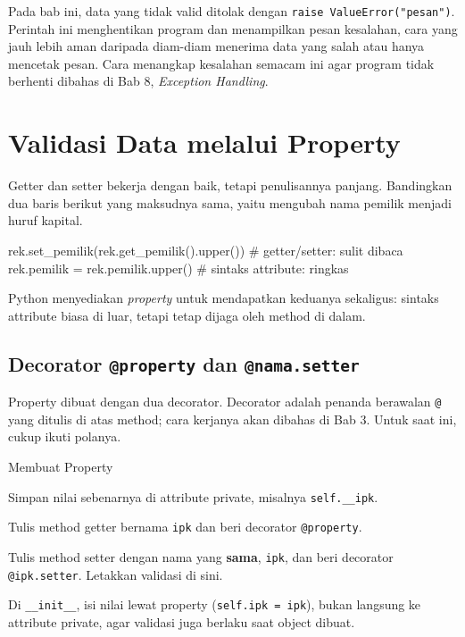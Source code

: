 \begin{info}
Pada bab ini, data yang tidak valid ditolak dengan \texttt{raise ValueError("pesan")}. Perintah ini menghentikan program dan menampilkan pesan kesalahan, cara yang jauh lebih aman daripada diam-diam menerima data yang salah atau hanya mencetak pesan. Cara menangkap kesalahan semacam ini agar program tidak berhenti dibahas di Bab 8, \emph{Exception Handling}.
\end{info}

\section{Validasi Data melalui Property}

Getter dan setter bekerja dengan baik, tetapi penulisannya panjang. Bandingkan dua baris berikut yang maksudnya sama, yaitu mengubah nama pemilik menjadi huruf kapital.

\begin{kode}
rek.set_pemilik(rek.get_pemilik().upper())   # getter/setter: sulit dibaca
rek.pemilik = rek.pemilik.upper()            # sintaks attribute: ringkas
\end{kode}

Python menyediakan \emph{property} untuk mendapatkan keduanya sekaligus: sintaks attribute biasa di luar, tetapi tetap dijaga oleh method di dalam.

\subsection{Decorator \texttt{@property} dan \texttt{@nama.setter}}

Property dibuat dengan dua decorator. Decorator adalah penanda berawalan \texttt{@} yang ditulis di atas method; cara kerjanya akan dibahas di Bab 3. Untuk saat ini, cukup ikuti polanya.

\begin{langkah}{Membuat Property}
  \item Simpan nilai sebenarnya di attribute private, misalnya \texttt{self.\_\_ipk}.
  \item Tulis method getter bernama \texttt{ipk} dan beri decorator \texttt{@property}.
  \item Tulis method setter dengan nama yang \textbf{sama}, \texttt{ipk}, dan beri decorator \texttt{@ipk.setter}. Letakkan validasi di sini.
  \item Di \texttt{\_\_init\_\_}, isi nilai lewat property (\texttt{self.ipk = ipk}), bukan langsung ke attribute private, agar validasi juga berlaku saat object dibuat.
\end{langkah}

